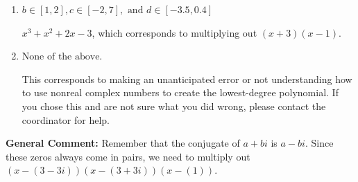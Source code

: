 \documentclass{extbook}[14pt]
\begin{document}
\begin{enumerate}
{\begin{enumerate}[label=\Alph*.]
$x^{3} +7 x^{2} +24 x + 18$, which corresponds to multiplying out $(x-(3 - 3 i))(x-(3 + 3 i))(x + 1)$.
\item \( b \in [1, 2], c \in [-2, 7], \text{ and } d \in [-3.5, 0.4] \)

$x^{3} + x^{2} +2 x -3$, which corresponds to multiplying out $(x + 3)(x -1)$.
\item \( \text{None of the above.} \)

This corresponds to making an unanticipated error or not understanding how to use nonreal complex numbers to create the lowest-degree polynomial. If you chose this and are not sure what you did wrong, please contact the coordinator for help.
\end{enumerate}

\textbf{General Comment:} Remember that the conjugate of $a+bi$ is $a-bi$. Since these zeros always come in pairs, we need to multiply out $(x-(3 - 3 i))(x-(3 + 3 i))(x-(1))$.
}
\end{enumerate}
\end{document}
